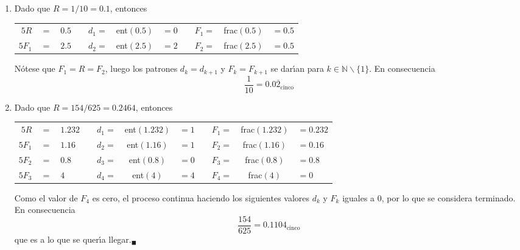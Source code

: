 \begin{solucion}
\begin{enumerate}
  \item Dado que $R = 1/10 = 0.1$, entonces 
  \begin{center}
   \begin{tabular}{rclcrclcrcl}
    $5R$ & $=$ & $0.5$ & \hspace{1.5cm} & $d_1 =$ & ent$(0.5)$ & $=0$ & \hspace{1.5cm} & $F_1=$ & frac$(0.5)$ & $=0.5$ \\
    $5F_1$ & $=$ & $2.5$ & & $d_2 =$ & ent$(2.5)$ & $=2$ & & $F_2=$ & frac$(2.5)$ & $=0.5$
   \end{tabular}
  \end{center}
  N\'otese que $F_1 = R = F_2$, luego los patrones $d_k = d_{k+1}$ y $F_k = F_{k+1}$ se dar\'{\i}an para $k\in\mathbb{N}\backslash\{ 1 \}$. En consecuencia
  \begin{equation*}
   \frac{1}{10} = 0.0\overline{2}_{\text{cinco}}
  \end{equation*}

  \item Dado que $R = 154/625 = 0.2464$, entonces 
  \begin{center}
   \begin{tabular}{rclcrclcrcl}
    $5R$ & $=$ & $1.232$ & \hspace{1.2cm} & $d_1 =$ & ent$\left( 1.232 \right)$ & $=1$ & \hspace{1cm} & $F_1=$ & frac$\left( 1.232 \right)$ & $=0.232$ \\
    $5F_1$ & $=$ & $1.16$ & & $d_2 =$ & ent$\left( 1.16 \right)$ & $=1$ & & $F_2=$ & frac$\left( 1.16 \right)$ & $=0.16$ \\
    $5F_2$ & $=$ & $0.8$ & & $d_3 =$ & ent$(0.8)$ & $=0$ & & $F_3 =$ & frac$(0.8)$ & $=0.8$ \\
    $5F_3$ & $=$ & $4$ & & $d_4 =$ & ent$(4)$ & $=4$ & & $F_4 =$ & frac$(4)$ & $=0$ \\
   \end{tabular}
  \end{center}
  Como el valor de $F_4$ es cero, el proceso continua haciendo los siguientes valores $d_k$ y $F_k$ iguales a $0$, por lo que se considera terminado. En consecuencia
  \begin{equation*}
   \frac{154}{625} = 0.1104_{\text{cinco}}
  \end{equation*}
  que es a lo que se quer\'{\i}a llegar.${}_{\blacksquare}$
 \end{enumerate}

\end{solucion}
